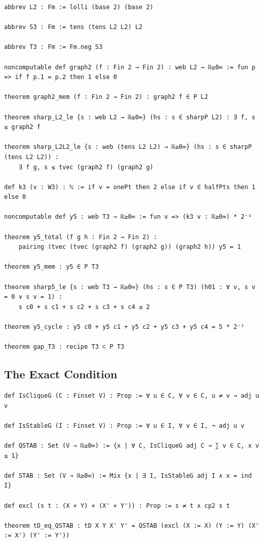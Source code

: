 \begin{lstlisting}
abbrev L2 : Fm := lolli (base 2) (base 2)

abbrev S3 : Fm := tens (tens L2 L2) L2

abbrev T3 : Fm := Fm.neg S3

noncomputable def graph2 (f : Fin 2 → Fin 2) : web L2 → ℝ≥0∞ := fun p => if f p.1 = p.2 then 1 else 0

theorem graph2_mem (f : Fin 2 → Fin 2) : graph2 f ∈ P L2

theorem sharp_L2_le {s : web L2 → ℝ≥0∞} (hs : s ∈ sharpP L2) : ∃ f, s ≤ graph2 f

theorem sharp_L2L2_le {s : web (tens L2 L2) → ℝ≥0∞} (hs : s ∈ sharpP (tens L2 L2)) :
    ∃ f g, s ≤ tvec (graph2 f) (graph2 g)

def k3 (v : W3) : ℕ := if v = onePt then 2 else if v ∈ halfPts then 1 else 0

noncomputable def y5 : web T3 → ℝ≥0∞ := fun v => (k3 v : ℝ≥0∞) * 2⁻¹

theorem y5_total (f g h : Fin 2 → Fin 2) :
    pairing (tvec (tvec (graph2 f) (graph2 g)) (graph2 h)) y5 = 1

theorem y5_mem : y5 ∈ P T3

theorem sharp5_le {s : web T3 → ℝ≥0∞} (hs : s ∈ P T3) (h01 : ∀ v, s v = 0 ∨ s v = 1) :
    s c0 + s c1 + s c2 + s c3 + s c4 ≤ 2

theorem y5_cycle : y5 c0 + y5 c1 + y5 c2 + y5 c3 + y5 c4 = 5 * 2⁻¹

theorem gap_T3 : recipe T3 ⊂ P T3
\end{lstlisting}

\subsection{The Exact Condition}

\begin{lstlisting}
def IsCliqueG (C : Finset V) : Prop := ∀ u ∈ C, ∀ v ∈ C, u ≠ v → adj u v

def IsStableG (I : Finset V) : Prop := ∀ u ∈ I, ∀ v ∈ I, ¬ adj u v

def QSTAB : Set (V → ℝ≥0∞) := {x | ∀ C, IsCliqueG adj C → ∑ v ∈ C, x v ≤ 1}

def STAB : Set (V → ℝ≥0∞) := Mix {x | ∃ I, IsStableG adj I ∧ x = ind I}

def excl (s t : (X × Y) × (X' × Y')) : Prop := s ≠ t ∧ cp2 s t

theorem tD_eq_QSTAB : tD X Y X' Y' = QSTAB (excl (X := X) (Y := Y) (X' := X') (Y' := Y'))
\end{lstlisting}

